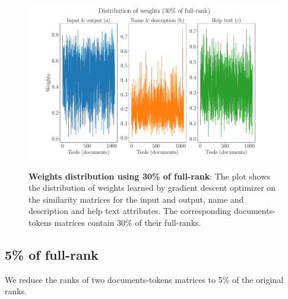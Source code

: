 \begin{figure}[h]
\begin{centering}
    {\includegraphics[scale=0.35]{figures/Weights_030.pdf}}
    \caption[Weights distribution 30\% rank]{\textbf{Weights distribution using 30\% of full-rank}: The plot shows the distribution of weights learned by gradient descent optimizer on the similarity matrices for the input and output, name and description and help text attributes. The corresponding documents-tokens matrices contain 30\% of their full-ranks.}
\end{centering}
\end{figure}

\subsection{5\% of full-rank}
We reduce the ranks of two documents-tokens matrices to 5\% of the original ranks.

